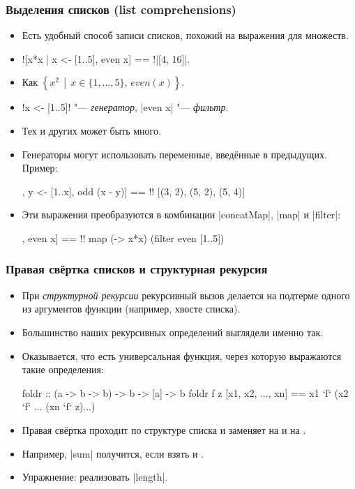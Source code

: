 \documentclass[11pt]{beamer}
\begin{document}
\begin{frame}[fragile]
  \frametitle{Выделения списков (list comprehensions)}
  \begin{itemize}
    \item Есть удобный способ записи списков, похожий на выражения для множеств.
    \item[] \haskinline![x*x | x <- [1..5], even x] == !\pause \haskinline|[4, 16]|.
    \item Как \(\left\{x^2\,\middle|\,x \in \{1, \ldots, 5\},\,even(x)\right\}\).
    \item \haskinline!x <- [1..5]! "--- \emph{генератор}, \haskinline|even x| "--- \emph{фильтр}.
          \pause
    \item Тех и других может быть много.
    \item Генераторы могут использовать переменные, введённые в предыдущих. Пример:
          \begin{haskell}
            [(x, y) | x <- [1..5], y <- [1..x], odd (x - y)] == !\pause!
              [(3, 2), (5, 2), (5, 4)]
          \end{haskell}
    \item Эти выражения преобразуются в комбинации \haskinline|concatMap|, \haskinline|map| и \haskinline|filter|:
          \begin{haskell}
            [x*x | x <- [1..5], even x] == !\pause!
                map (\x -> x*x) (filter even [1..5])
          \end{haskell}
  \end{itemize}
\end{frame}

\begin{frame}[fragile]
  \frametitle{Правая свёртка списков и структурная рекурсия}
  \begin{itemize}
    \item При \emph{структурной рекурсии} рекурсивный вызов делается на подтерме одного из аргументов функции (например, хвосте списка).
    \item Большинство наших рекурсивных определений выглядели именно так.
    \pause
    \item Оказывается, что есть универсальная функция, через которую выражаются такие определения:
          \begin{haskell}
            foldr :: (a -> b -> b) -> b -> [a] -> b
            foldr f z [x1, x2, ..., xn] == 
              x1 `f` (x2 `f` ... (xn `f` z)...)
          \end{haskell}
    \item Правая свёртка проходит по структуре списка и заменяет \haskinline{[]} на  и \haskinline{(:)} на .
    \item Например, \haskinline|sum| получится, если взять  и .
    \item Упражнение: реализовать \haskinline|length|.
  \end{itemize}
\end{frame}
\end{document}
